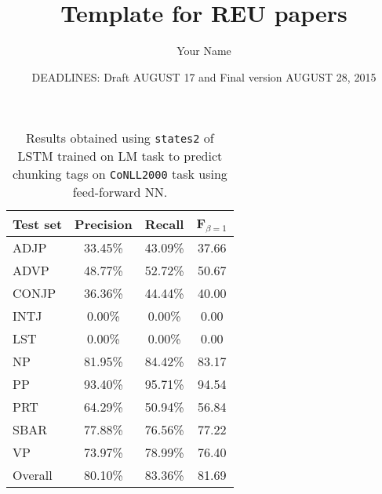 \documentclass[psamsfonts]{amsart}
\title{Template for REU papers}
\author{Your Name}
\date{DEADLINES: Draft AUGUST 17 and Final version AUGUST 28, 2015}
\theoremstyle{definition}
\theoremstyle{remark}
\numberwithin{equation}{section}
\begin{document}
\begin{table}[t]
	\begin{center}
		\begin{tabular}{|l|c|c|c|}\cline{2-4}
			\multicolumn{1}{l|}{Test set}
        & Precision &  Recall  & F$_{\beta=1}$ \\\hline
        ADJP    &   33.45\% &  43.09\% &  37.66 \\
        ADVP    &   48.77\% &  52.72\% &  50.67 \\
        CONJP   &   36.36\% &  44.44\% &  40.00 \\
        INTJ    &    0.00\% &   0.00\% &   0.00 \\
        LST     &    0.00\% &   0.00\% &   0.00 \\
        NP      &   81.95\% &  84.42\% &  83.17 \\
        PP      &   93.40\% &  95.71\% &  94.54 \\
        PRT     &   64.29\% &  50.94\% &  56.84 \\
        SBAR    &   77.88\% &  76.56\% &  77.22 \\
        VP      &   73.97\% &  78.99\% &  76.40 \\\hline
        Overall &   80.10\% &  83.36\% &  81.69 \\\hline
\end{tabular}
\end{center}
\caption{
	Results obtained using \texttt{states2} of LSTM trained on LM task to predict chunking tags on \texttt{CoNLL2000} task using feed-forward NN.
} 
\label{tab-final}
\end{table}
\end{document}
